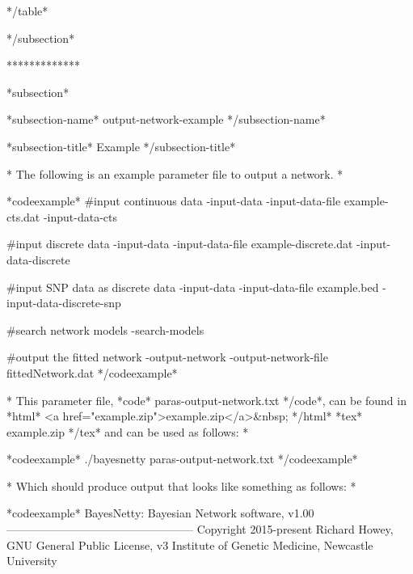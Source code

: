 */table*

*/subsection*

*************

*subsection*

*subsection-name* output-network-example */subsection-name*

*subsection-title* Example */subsection-title*

* The following is an example parameter file to output a network. *

*codeexample* #input continuous data -input-data -input-data-file example-cts.dat -input-data-cts

#input discrete data -input-data -input-data-file example-discrete.dat -input-data-discrete

#input SNP data as discrete data -input-data -input-data-file example.bed -input-data-discrete-snp

#search network models -search-models

#output the fitted network -output-network -output-network-file fittedNetwork.dat */codeexample*

* This parameter file, *code* paras-output-network.txt */code*, can be found in *html* <a href="example.zip">example.zip</a>&nbsp; */html* *tex* example.zip */tex* and can be used as follows: *

*codeexample* ./bayesnetty paras-output-network.txt */codeexample*

* Which should produce output that looks like something as follows: *

*codeexample* BayesNetty: Bayesian Network software, v1.00 -------------------------------------------------- Copyright 2015-present Richard Howey, GNU General Public License, v3 Institute of Genetic Medicine, Newcastle University

